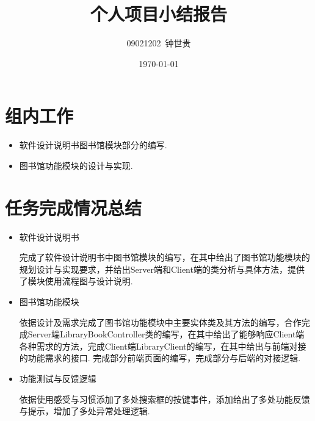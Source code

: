 \documentclass{article}
\title{个人项目小结报告}
\author{09021202~钟世贵}
\date{\today}
\begin{document}
\maketitle

\section{组内工作}
\begin{itemize}
      \item 软件设计说明书图书馆模块部分的编写.

      \item 图书馆功能模块的设计与实现.
\end{itemize}


\section{任务完成情况总结}
\begin{itemize}
      \item 软件设计说明书

            完成了软件设计说明书中图书馆模块的编写，在其中给出了图书馆功能模块的规划设计与实现要求，并给出Server端和Client端的类分析与具体方法，提供了模块使用流程图与设计说明.

      \item 图书馆功能模块

            依据设计及需求完成了图书馆功能模块中主要实体类及其方法的编写，合作完成Server端LibraryBookController类的编写，在其中给出了能够响应Client端各种需求的方法，完成Client端LibraryClient的编写，在其中给出与前端对接的功能需求的接口. 完成部分前端页面的编写，完成部分与后端的对接逻辑.

      \item 功能测试与反馈逻辑

            依据使用感受与习惯添加了多处搜索框的按键事件，添加给出了多处功能反馈与提示，增加了多处异常处理逻辑.


\end{itemize}
\end{document}

